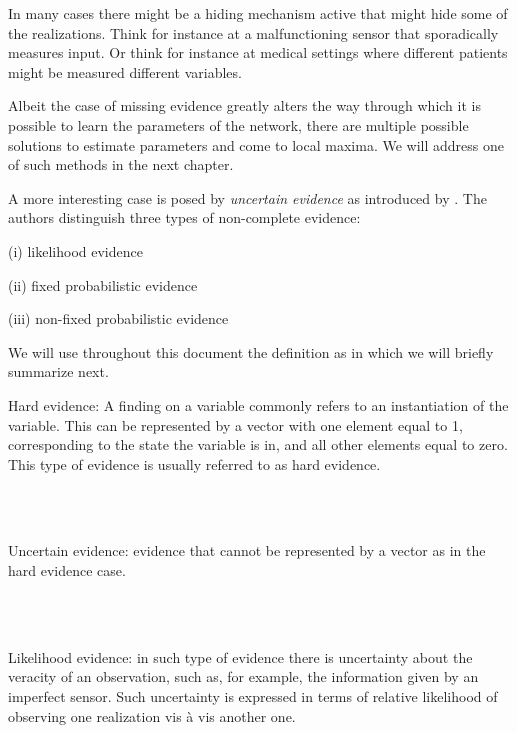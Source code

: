 \documentclass[11pt]{article}
\begin{document}
\begin{article}
In many cases there might be a hiding mechanism active that might
hide some of the realizations. Think for instance at a
malfunctioning sensor that sporadically measures input. Or think for
instance at medical settings where different patients might be
measured different variables.

Albeit the case of missing evidence greatly alters the way through
which it is possible to learn the parameters of the network, there
are multiple possible solutions to estimate parameters and come to
local maxima. We will address one of such methods in the next
chapter.

A more interesting case is posed by \emph{uncertain evidence} as
introduced by \cite{Mrad_2015}. The authors distinguish three types of
non-complete evidence:

(i) likelihood evidence

(ii) fixed probabilistic evidence

(iii) non-fixed probabilistic evidence

We will use throughout this document the definition as in
\cite{Mrad_2015} which we will briefly summarize next.

\begin{definition}
Hard evidence: A finding on a variable commonly refers to an
instantiation of the variable. This can be represented by a vector
with one element equal to 1, corresponding to the state the variable
is in, and all other elements equal to zero. This type of evidence
is usually referred to as hard evidence.
\end{definition}

\\\\

\begin{definition}
Uncertain evidence: evidence that cannot be represented by a vector
as in the hard evidence case.
\end{definition}

\\\\

\begin{definition}
Likelihood evidence: in such type of evidence there is uncertainty
about the veracity of an observation, such as, for example, the
information given by an imperfect sensor. Such uncertainty is
expressed in terms of relative likelihood of observing one
realization vis à vis another one. 
\end{definition}


\end{article}
\end{document}
